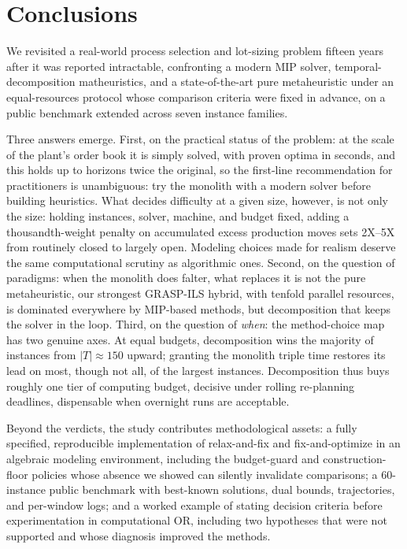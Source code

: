 \section{Conclusions}
\label{sec:conclusions}

We revisited a real-world process selection and lot-sizing problem
fifteen years after it was reported intractable, confronting a
modern MIP solver, temporal-decomposition matheuristics, and a
state-of-the-art pure metaheuristic under an equal-resources protocol
whose comparison criteria were fixed in advance, on a public benchmark
extended across seven instance families.

Three answers emerge. First, on the practical status of the
problem: at the scale of the plant's order book it is simply solved, with proven optima in seconds, and this holds up to horizons twice
the original, so the first-line recommendation for practitioners is
unambiguous: try the monolith with a modern solver before building
heuristics. What decides difficulty at a given size, however, is not
only the size: holding instances, solver, machine, and budget fixed,
adding a thousandth-weight penalty on accumulated excess production
moves sets 2X--5X from routinely closed to largely open. Modeling
choices made for realism deserve the same computational scrutiny as
algorithmic ones. Second, on the question
of paradigms: when the monolith does falter, what replaces it is
not the pure metaheuristic, our strongest GRASP-ILS hybrid, with
tenfold parallel resources, is dominated everywhere by MIP-based
methods, but decomposition that keeps the solver in the loop.
Third, on the question of \emph{when}: the method-choice map has
two genuine axes. At equal budgets, decomposition wins the majority
of instances from $|T|\approx 150$ upward; granting the monolith
triple time restores its lead on most, though not all, of the
largest instances. Decomposition thus buys roughly one tier of
computing budget, decisive under rolling re-planning deadlines,
dispensable when overnight runs are acceptable.

Beyond the verdicts, the study contributes methodological assets:
a fully specified, reproducible implementation of relax-and-fix and
fix-and-optimize in an algebraic modeling environment, including
the budget-guard and construction-floor policies whose absence we
showed can silently invalidate comparisons; a 60-instance public
benchmark with best-known solutions, dual bounds, trajectories, and
per-window logs; and a worked example of stating decision criteria
before experimentation in computational OR, including two hypotheses
that were not supported and whose diagnosis improved the methods.

